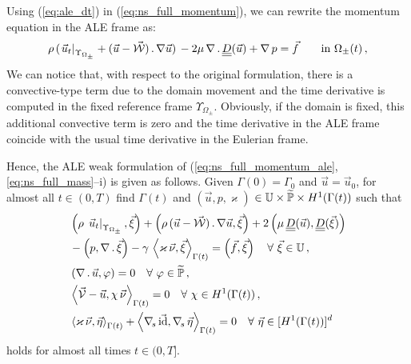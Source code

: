 Using (\ref{eq:ale_dt}) in (\ref{eq:ns_full_momentum}), we can rewrite the
momentum equation in the ALE frame as:
\begin{equation}
\begin{align}
\rho\,(\left.\vec{u}_t\right|_{\Upsilon_{\Omega_\pm}}
+(\vec u - \vec{\mathcal{W}})\,.\, \nabla \vec u)\,
-2 \mu\,\nabla\,.\, \mat D(\vec u)+ \nabla\,p & = \vec f
\quad &&\mbox{in } \Omega_\pm(t)\,, \label{eq:ns_full_momentum_ale} \\
\end{align}
\end{equation}
We can notice that, with respect to the original formulation, there is a
convective-type term due to the domain movement and the time derivative is
computed in the fixed reference frame $\Upsilon_{\Omega_\pm}$. Obviously, if
the domain is fixed, this additional convective term is zero and the time
derivative in the ALE frame coincide with the usual time derivative in the
Eulerian frame.

Hence, the ALE weak formulation of (\ref{eq:ns_full_momentum_ale},
\ref{eq:ns_full_mass}--i) is given as follows. Given $\Gamma(0) = \Gamma_0$ and
$\vec u = \vec u_0$, for almost all $t\in(0,T)$ find $\Gamma(t)$ and ${(\vec u,
p, \varkappa)}$ ${\in \mathbb{U} \times \widetilde{\mathbb{P}} \times H^1(\Gamma(t))}$ such
that
\begin{subequations}
\begin{align}
& \left(\rho\,\left.\vec{u}_t\right|_{\Upsilon_{\Omega_\pm}}, \vec \xi\right) +
\left(\rho\,(\vec u - \vec{\mathcal{W}})\,.\, \nabla \vec u,\vec \xi\right)
+ 2\left(\mu\,\mat D(\vec u), \mat D(\vec \xi)\right) \nonumber \\
& - \left(p, \nabla\,.\,\vec \xi\right)
- \gamma\,\left\langle \varkappa\,\vec\nu, \vec\xi\right\rangle_{\Gamma(t)}
= \left(\vec f, \vec \xi\right)\quad \forall\ \vec\xi \in \uspace \,,
\label{eq:ns_weaka_ale}\\
& \left(\nabla\,.\,\vec u, \varphi\right) = 0
\quad \forall\ \varphi \in \pnormspace\,, \label{eq:ns_weakb_ale} \\
&  \left\langle \V
- \vec u, \chi\,\vec\nu \right\rangle_{\Gamma(t)} = 0
\quad \forall\ \chi \in H^1(\Gamma(t))\,, \label{eq:ns_weakc_ale} \\
& \left\langle \varkappa\,\vec\nu, \vec\eta \right\rangle_{\Gamma(t)}
+ \left\langle \nabs\,\vec \id, \nabs\,\vec \eta \right\rangle_{\Gamma(t)}
= 0  \quad \forall\ \vec\eta \in [H^1(\Gamma(t))]^d\,\label{eq:ns_weakd_ale}
\end{align}
\end{subequations}
holds for almost all times $t \in (0,T]$.

